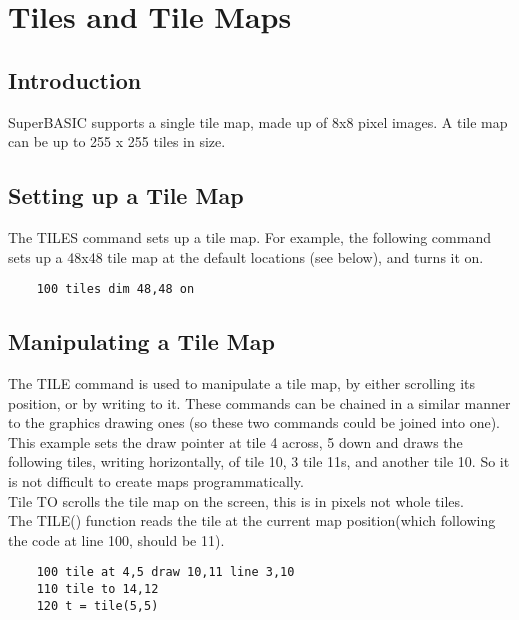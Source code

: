 \chapter{Tiles and Tile Maps}

\section{Introduction}

SuperBASIC supports a single tile map, made up of 8x8 pixel images. A tile map can be up to 255 x 255 tiles in size.

\section{Setting up a Tile Map}

The TILES command sets up a tile map. For example, the following command sets up a 48x48 tile map at the default locations (see below), and turns it on.

\begin{verbatim}
	100 tiles dim 48,48 on
\end{verbatim}

\section{Manipulating a Tile Map}

The TILE command is used to manipulate a tile map, by either scrolling its position, or by writing to it.  These commands can be chained in a similar manner to the graphics drawing ones (so these two commands could be joined into one).\\

This example sets the draw pointer at tile 4 across, 5 down and draws the following tiles, writing horizontally, of tile 10, 3 tile 11s, and another tile 10. So it is not difficult to create maps programmatically.\\

Tile TO scrolls the tile map on the screen, this is in pixels not whole tiles.\\

The TILE() function reads the tile at the current map position(which following the code at line 100, should be 11).

\begin{verbatim}
	100 tile at 4,5 draw 10,11 line 3,10
	110 tile to 14,12
	120 t = tile(5,5)
\end{verbatim}
		
